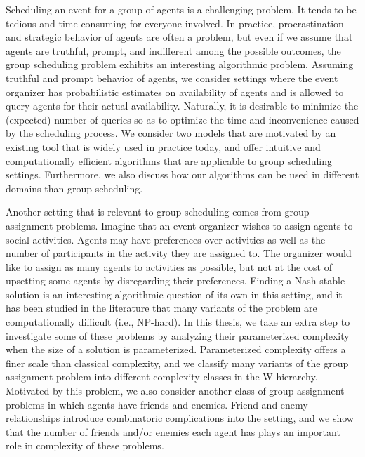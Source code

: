 Scheduling an event for a group of agents is a challenging problem. 
It tends to be tedious and time-consuming for everyone involved. 
In practice, procrastination and strategic behavior of agents are often a problem, but even if we assume that agents are truthful, prompt, and indifferent among the possible outcomes, the group scheduling problem exhibits an interesting algorithmic problem. Assuming truthful and prompt behavior of agents, we consider settings where the event organizer has probabilistic estimates on availability of agents and is allowed to query agents for their actual availability. Naturally, it is desirable to minimize the (expected) number of queries so as to optimize the time and inconvenience caused by the scheduling process. We consider two models that are motivated by an existing tool that is widely used in practice today, and offer intuitive and computationally efficient algorithms that are applicable to group scheduling settings. Furthermore, we also discuss how our algorithms can be used in different domains than group scheduling. 

Another setting that is relevant to group scheduling comes from group assignment problems. Imagine that an event organizer wishes to assign agents to social activities. Agents may have preferences over activities as well as the number of participants in the activity they are assigned to. The organizer would like to assign as many agents to activities as possible, but not at the cost of upsetting some agents by disregarding their preferences. Finding a Nash stable solution is an interesting algorithmic question of its own in this setting, and it has been studied in the literature that many variants of the problem are computationally difficult (i.e., NP-hard). In this thesis, we take an extra step to investigate some of these problems by analyzing their parameterized complexity when the size of a solution is parameterized. Parameterized complexity offers a finer scale than classical complexity, and we classify many variants of the group assignment problem into different complexity classes in the W-hierarchy. Motivated by this problem, we also consider another class of group assignment problems in which agents have friends and enemies. Friend and enemy relationships introduce combinatoric complications into the setting, and we show that the number of friends and/or enemies each agent has plays an important role in complexity of these problems. 


